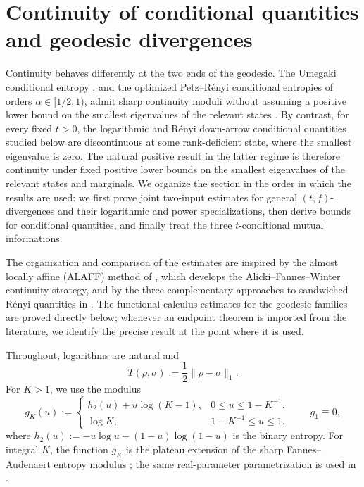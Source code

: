 \documentclass[11pt]{article}
\theoremstyle{remark}
\newcommand{\1}{\mathbbm{1}}
\begin{document}
\section{Continuity of conditional quantities and geodesic divergences}
\label{sec:continuity-interpolated-conditionals}

Continuity behaves differently at the two ends of the geodesic.
The Umegaki conditional entropy
\cite[Theorem~1.1 and Proposition~2.1]{berta2026sharpconditional},
and the optimized Petz--R\'enyi
conditional entropies of orders $\alpha\in[1/2,1)$, admit sharp
continuity moduli without assuming a positive lower bound on the
smallest eigenvalues of the relevant states
\cite[Theorem~2.1]{cheng2026sharprenyi}.  By contrast, for every fixed
$t>0$, the logarithmic and R\'enyi down-arrow conditional quantities
studied below are discontinuous at some rank-deficient state, where the
smallest eigenvalue is zero.  The natural positive result in the latter
regime is therefore continuity
under fixed positive lower bounds on the smallest eigenvalues of the
relevant states and marginals.  We organize the
section in the order in which the results are used: we first prove
joint two-input estimates for general $(t,f)$-divergences and their
logarithmic and power specializations, then derive bounds for
conditional quantities, and finally treat the three $t$-conditional
mutual informations.

The organization and comparison of the estimates are inspired by the
almost locally affine (ALAFF) method of
\cite[Section~4, especially Theorem~4.6]{bluhm2023continuity}, which
develops the Alicki--Fannes--Winter continuity strategy, and by the
three complementary approaches to sandwiched R\'enyi quantities in
\cite[Sections~4--5]{bluhm2026unified}.  The functional-calculus
estimates for the geodesic families are proved directly below; whenever
an endpoint theorem is imported from the literature, we identify the
precise result at the point where it is used.

Throughout, logarithms are natural and
\begin{equation}
 T(\rho,\sigma):=\frac12\lVert\rho-\sigma\rVert_1.
 \label{eq:continuity-trace-distance}
\end{equation}
For $K>1$, we use the modulus
\begin{equation}
 g_K(u):=
 \begin{cases}
  h_2(u)+u\log(K-1),&0\leq u\leq1-K^{-1},\\
  \log K,&1-K^{-1}\leq u\leq1,
 \end{cases}
 \qquad g_1\equiv0,
 \label{eq:def-gK-continuity}
\end{equation}
where $h_2(u):=-u\log u-(1-u)\log(1-u)$ is the binary entropy.
For integral $K$, the function $g_K$ is the plateau extension of the
sharp Fannes--Audenaert entropy modulus
\cite[Theorem~1]{audenaert2007sharp}; the same real-parameter
parametrization is used in
\cite[Eq.~(4)]{berta2026sharpconditional}.
\end{document}
